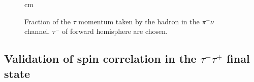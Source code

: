 \documentclass[12pt]{article}
\def\TauTau{\ensuremath{\tau^{-}\tau^{+}}\xspace}
\def\Tau{\ensuremath{\tau}\xspace}
\def\TauMin{\ensuremath{\tau^-}\xspace}
\def\PI{\ensuremath{\pi^{-}\nu}\xspace}
\begin{document}
\begin{figure}
 \centering
{}   cm 
{}
\caption{
Fraction of the \Tau momentum taken by the hadron in the \PI 
channel. \TauMin of forward hemisphere are chosen.
}
\label{fig:XfrFB}
\end{figure}



\subsection{Validation of spin correlation in the \TauTau final
state}
\end{document}
